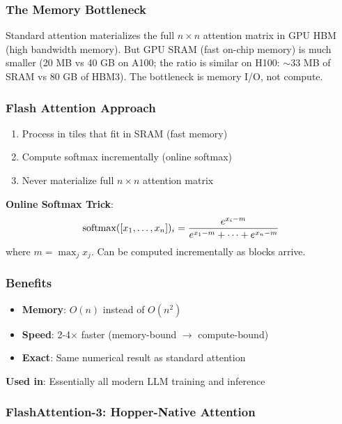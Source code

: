 \subsubsection{The Memory Bottleneck}

Standard attention materializes the full $n \times n$ attention matrix in GPU HBM (high bandwidth memory). But GPU SRAM (fast on-chip memory) is much smaller (20 MB vs 40 GB on A100; the ratio is similar on H100: $\sim$33 MB of SRAM vs 80 GB of HBM3). The bottleneck is memory I/O, not compute.

\subsubsection{Flash Attention Approach}

\begin{enumerate}
    \item Process in tiles that fit in SRAM (fast memory)
    \item Compute softmax incrementally (online softmax)
    \item Never materialize full $n \times n$ attention matrix
\end{enumerate}

\textbf{Online Softmax Trick}:
\begin{equation}
\operatorname{softmax}([x_1, \ldots, x_n])_i = \frac{e^{x_i - m}}{e^{x_1 - m} + \cdots + e^{x_n - m}}
\end{equation}
where $m = \max_j x_j$. Can be computed incrementally as blocks arrive.

\subsubsection{Benefits}

\begin{itemize}
    \item \textbf{Memory}: $O(n)$ instead of $O(n^2)$
    \item \textbf{Speed}: 2-4$\times$ faster (memory-bound $\to$ compute-bound)
    \item \textbf{Exact}: Same numerical result as standard attention
\end{itemize}

\textbf{Used in}: Essentially all modern LLM training and inference

\subsubsection{FlashAttention-3: Hopper-Native Attention}


